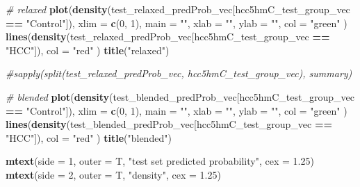 \documentclass[
]{book}
\newenvironment{Shaded}{\begin{snugshade}}{\end{snugshade}}
\newcommand{\CommentTok}[1]{\textcolor[rgb]{0.56,0.35,0.01}{\textit{#1}}}
\newcommand{\DataTypeTok}[1]{\textcolor[rgb]{0.13,0.29,0.53}{#1}}
\newcommand{\DecValTok}[1]{\textcolor[rgb]{0.00,0.00,0.81}{#1}}
\newcommand{\FloatTok}[1]{\textcolor[rgb]{0.00,0.00,0.81}{#1}}
\newcommand{\KeywordTok}[1]{\textcolor[rgb]{0.13,0.29,0.53}{\textbf{#1}}}
\newcommand{\NormalTok}[1]{#1}
\newcommand{\OperatorTok}[1]{\textcolor[rgb]{0.81,0.36,0.00}{\textbf{#1}}}
\newcommand{\StringTok}[1]{\textcolor[rgb]{0.31,0.60,0.02}{#1}}
\begin{document}
\begin{Shaded}
\begin{Highlighting}[]
\CommentTok{\# relaxed}
\KeywordTok{plot}\NormalTok{(}\KeywordTok{density}\NormalTok{(test\_relaxed\_predProb\_vec[hcc5hmC\_test\_group\_vec }\OperatorTok{==}\StringTok{ "Control"}\NormalTok{]),}
  \DataTypeTok{xlim =} \KeywordTok{c}\NormalTok{(}\DecValTok{0}\NormalTok{, }\DecValTok{1}\NormalTok{), }\DataTypeTok{main =} \StringTok{""}\NormalTok{, }\DataTypeTok{xlab =} \StringTok{""}\NormalTok{, }\DataTypeTok{ylab =} \StringTok{""}\NormalTok{, }\DataTypeTok{col =} \StringTok{"green"}
\NormalTok{)}
\KeywordTok{lines}\NormalTok{(}\KeywordTok{density}\NormalTok{(test\_relaxed\_predProb\_vec[hcc5hmC\_test\_group\_vec }\OperatorTok{==}\StringTok{ "HCC"}\NormalTok{]),}
  \DataTypeTok{col =} \StringTok{"red"}
\NormalTok{)}
\KeywordTok{title}\NormalTok{(}\StringTok{"relaxed"}\NormalTok{)}

\CommentTok{\#sapply(split(test\_relaxed\_predProb\_vec, hcc5hmC\_test\_group\_vec), summary)}


\CommentTok{\# blended}
\KeywordTok{plot}\NormalTok{(}\KeywordTok{density}\NormalTok{(test\_blended\_predProb\_vec[hcc5hmC\_test\_group\_vec }\OperatorTok{==}\StringTok{ "Control"}\NormalTok{]),}
  \DataTypeTok{xlim =} \KeywordTok{c}\NormalTok{(}\DecValTok{0}\NormalTok{, }\DecValTok{1}\NormalTok{), }\DataTypeTok{main =} \StringTok{""}\NormalTok{, }\DataTypeTok{xlab =} \StringTok{""}\NormalTok{, }\DataTypeTok{ylab =} \StringTok{""}\NormalTok{, }\DataTypeTok{col =} \StringTok{"green"}
\NormalTok{)}
\KeywordTok{lines}\NormalTok{(}\KeywordTok{density}\NormalTok{(test\_blended\_predProb\_vec[hcc5hmC\_test\_group\_vec }\OperatorTok{==}\StringTok{ "HCC"}\NormalTok{]),}
  \DataTypeTok{col =} \StringTok{"red"}
\NormalTok{)}
\KeywordTok{title}\NormalTok{(}\StringTok{"blended"}\NormalTok{)}

\KeywordTok{mtext}\NormalTok{(}\DataTypeTok{side =} \DecValTok{1}\NormalTok{, }\DataTypeTok{outer =}\NormalTok{ T, }\StringTok{"test set predicted probability"}\NormalTok{, }\DataTypeTok{cex =} \FloatTok{1.25}\NormalTok{)}
\KeywordTok{mtext}\NormalTok{(}\DataTypeTok{side =} \DecValTok{2}\NormalTok{, }\DataTypeTok{outer =}\NormalTok{ T, }\StringTok{"density"}\NormalTok{, }\DataTypeTok{cex =} \FloatTok{1.25}\NormalTok{)}
\end{Highlighting}
\end{Shaded}
\end{document}
